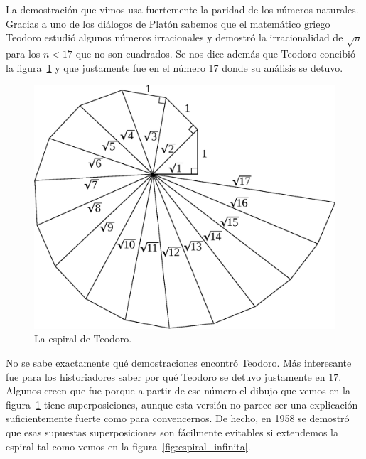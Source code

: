 La demostración que vimos usa fuertemente la paridad de los números naturales.
Gracias a uno de los diálogos de Platón sabemos que el matemático griego
Teodoro estudió algunos números irracionales y demostró la irracionalidad de
$\sqrt{n}$ para los $n<17$ que no son cuadrados. Se nos dice además que Teodoro
concibió la figura~\ref{fig:teodoro} y que justamente fue en el número 17 donde
su análisis se detuvo. 

\begin{figure}[h]
		\centering
		\includegraphics[scale=0.3]{images/teodoro}
		\caption{La espiral de Teodoro.}
		\label{fig:teodoro}
\end{figure}

No se sabe exactamente qué demostraciones encontró
Teodoro. Más interesante fue para los historiadores saber por qué Teodoro se
detuvo justamente en $17$. Algunos creen que fue porque a partir de ese número
el dibujo que vemos en la figura~\ref{fig:teodoro} tiene superposiciones, aunque
esta versión no parece ser una explicación suficientemente fuerte 
como para convencernos. De hecho, en 1958 se demostró que esas supuestas superposiciones 
son fácilmente evitables si extendemos la espiral tal como vemos en la
figura~\ref{fig:espiral_infinita}.  

